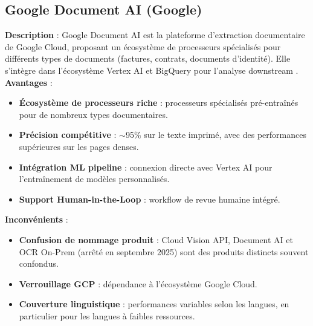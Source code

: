 \subsection{Google Document AI (Google)}
\textbf{Description} :
Google Document AI est la plateforme d'extraction documentaire de Google Cloud, proposant un écosystème de processeurs spécialisés pour différents types de documents (factures, contrats, documents d'identité). Elle s'intègre dans l'écosystème Vertex AI et BigQuery pour l'analyse downstream \cite{google2024documentai}.
\\
\textbf{Avantages} :
\begin{itemize}[label=, font=\large \color{darkgray}]
\item \textbf{Écosystème de processeurs riche} : processeurs spécialisés pré-entraînés pour de nombreux types documentaires.
\item \textbf{Précision compétitive} : $\sim$95\% sur le texte imprimé, avec des performances supérieures sur les pages denses.
\item \textbf{Intégration ML pipeline} : connexion directe avec Vertex AI pour l'entraînement de modèles personnalisés.
\item \textbf{Support Human-in-the-Loop} : workflow de revue humaine intégré.
\end{itemize}

\textbf{Inconvénients} :
\begin{itemize}[label=, font=\large \color{darkgray}]
\item \textbf{Confusion de nommage produit} : Cloud Vision API, Document AI et OCR On-Prem (arrêté en septembre 2025) sont des produits distincts souvent confondus.
\item \textbf{Verrouillage GCP} : dépendance à l'écosystème Google Cloud.
\item \textbf{Couverture linguistique} : performances variables selon les langues, en particulier pour les langues à faibles ressources.
\end{itemize}


